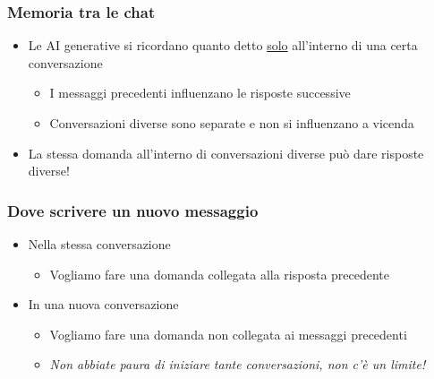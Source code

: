 
\begin{contentframe}
    \frametitle{Memoria tra le chat}

    \begin{itemize}
        \item Le AI generative si ricordano quanto detto \underline{solo} all'interno di una certa conversazione
        \begin{itemize}
            \item I messaggi precedenti influenzano le risposte successive
            \item Conversazioni diverse sono separate e non si influenzano a vicenda
        \end{itemize}
        
        \bigskip
        \item La stessa domanda all'interno di conversazioni diverse può dare risposte diverse!
    \end{itemize}
\end{contentframe}

\begin{contentframe}
    \frametitle{Dove scrivere un nuovo messaggio}

    \begin{itemize}
        \item Nella stessa conversazione
        \begin{itemize}
            \item Vogliamo fare una domanda collegata alla risposta precedente
        \end{itemize}

        \bigskip
        \item In una nuova conversazione
        \begin{itemize}
            \item Vogliamo fare una domanda non collegata ai messaggi precedenti
            \item \textit{Non abbiate paura di iniziare tante conversazioni, non c'è un limite!}
        \end{itemize}
    \end{itemize}
\end{contentframe}

